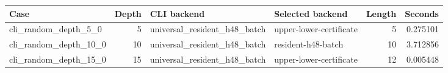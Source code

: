 {\small
\begin{tabular}{lrllrr}
\hline
Case & Depth & CLI backend & Selected backend & Length & Seconds \\
\hline
cli\_random\_depth\_5\_0 & 5 & universal\_resident\_h48\_batch & upper-lower-certificate & 5 & 0.275101 \\
cli\_random\_depth\_10\_0 & 10 & universal\_resident\_h48\_batch & resident-h48-batch & 10 & 3.712856 \\
cli\_random\_depth\_15\_0 & 15 & universal\_resident\_h48\_batch & upper-lower-certificate & 12 & 0.005448 \\
\hline
\end{tabular}
}
